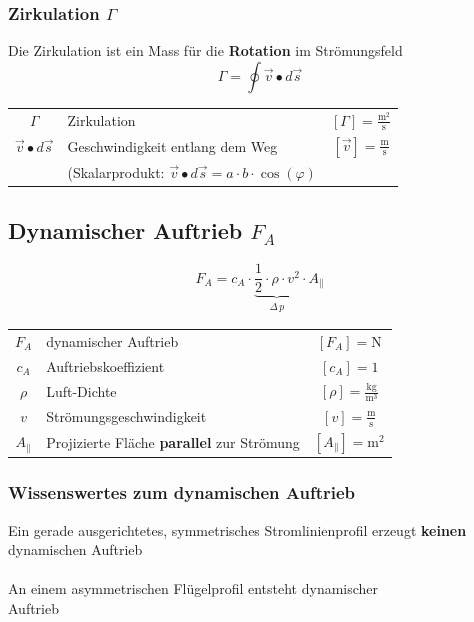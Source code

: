 \subsubsection{Zirkulation $\Gamma$}
Die Zirkulation ist ein Mass für die \textbf{Rotation} im Strömungsfeld \\

$$ \boxed{ \Gamma = 	\oint \vec{v} \bullet d\vec{s} } $$


\begin{tabular}{c l c}
		\rule{0pt}{8pt}$\Gamma$ & Zirkulation & $[\Gamma] = \mathrm{\frac{m^2}{s}}$ \\
		\rule{0pt}{8pt}$\vec{v} \bullet d\vec{s}$ & Geschwindigkeit entlang dem Weg & $[\vec{v}] = \mathrm{\frac{m}{s}}$  \\
		& (Skalarprodukt: $\vec{v} \bullet d\vec{s} = a \cdot b \cdot \cos(\varphi)$ & \\
\end{tabular}


\vfill\null
\columnbreak



\subsection{Dynamischer Auftrieb $F_A$}

$$ \boxed{ F_A = c_A \cdot  \underbrace{\frac{1}{2} \cdot \rho \cdot v^2 }_{\substack{\Delta \, p}} \cdot A_{\|}	} $$


\begin{tabular}{c l c}
		$F_A$ & dynamischer Auftrieb & $[F_A] = \mathrm{N}$ \\
		$c_A$ & Auftriebskoeffizient & $[c_A] = 1$ \\
		\rule{0pt}{8pt}$\rho$ & Luft-Dichte & $[\rho] = \mathrm{\frac{kg}{m^3}}$ \\
		\rule{0pt}{8pt}$v$ & Strömungsgeschwindigkeit & $[v] = \mathrm{\frac{m}{s}}$ \\
		$A_{\|}$ & Projizierte Fläche \textbf{parallel} zur Strömung & $[A_{\|}] = \mathrm{m^2}$ \\
\end{tabular}




\subsubsection{Wissenswertes zum dynamischen Auftrieb}
Ein gerade ausgerichtetes, symmetrisches Stromlinienprofil erzeugt \textbf{keinen} dynamischen Auftrieb \\
\\
An einem asymmetrischen Flügelprofil entsteht dynamischer\\
Auftrieb 


